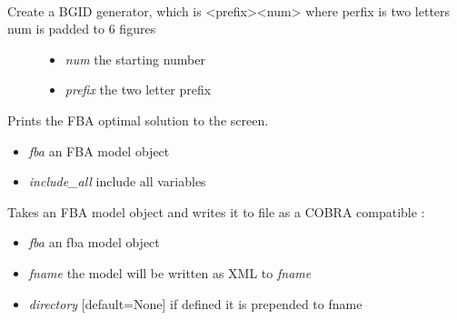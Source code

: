 \documentclass[a4paper,11pt,english]{sphinxmanual}
\begin{document}

\begin{fulllineitems}
\label{modules_doc:cbmpy.CBWrite.generateBGID}~\begin{description}
\item[{Create a BGID generator, which is \textless{}prefix\textgreater{}\textless{}num\textgreater{} where perfix is two letters num is padded to 6 figures}] \leavevmode\begin{itemize}
\item {} 
\emph{num} the starting number

\item {} 
\emph{prefix} the two letter prefix

\end{itemize}

\end{description}

\end{fulllineitems}


\begin{fulllineitems}
\label{modules_doc:cbmpy.CBWrite.printFBASolution}
Prints the FBA optimal solution to the screen.
\begin{itemize}
\item {} 
\emph{fba} an FBA model object

\item {} 
\emph{include\_all} include all variables

\end{itemize}

\end{fulllineitems}


\begin{fulllineitems}
\label{modules_doc:cbmpy.CBWrite.writeCOBRASBML}
Takes an FBA model object and writes it to file as a COBRA compatible :
\begin{itemize}
\item {} 
\emph{fba} an fba model object

\item {} 
\emph{fname} the model will be written as XML to \emph{fname}

\item {} 
\emph{directory} {[}default=None{]} if defined it is prepended to fname

\end{itemize}

\end{fulllineitems}
\end{document}
